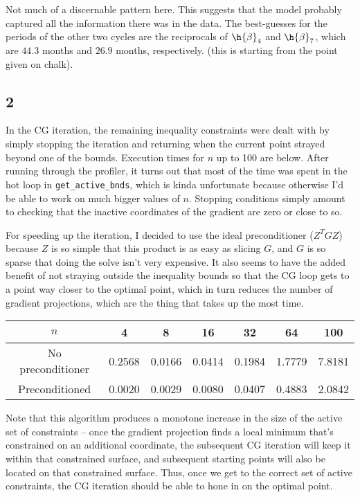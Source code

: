 \documentclass{article}
\begin{document}
Not much of a discernable pattern here. This suggests that the model probably captured all the information there was in the data. The best-guesses for the periods of the other two cycles are the reciprocals of $\h{\beta}_4$ and $\h{\beta}_7$, which are $44.3$ months and $26.9$ months, respectively. (this is starting from the point given on chalk).
\subsection*{2}
In the CG iteration, the remaining inequality constraints were dealt with by simply stopping the iteration and returning when the current point strayed beyond one of the bounds. Execution times for $n$ up to 100 are below. After running through the profiler, it turns out that most of the time was spent in the hot loop in \verb|get_active_bnds|, which is kinda unfortunate because otherwise I'd be able to work on much bigger values of $n$. Stopping conditions simply amount to checking that the inactive coordinates of the gradient are zero or close to so.

For speeding up the iteration, I decided to use the ideal preconditioner ($Z^TGZ$) because $Z$ is so simple that this product is as easy as slicing $G$, and $G$ is so sparse that doing the solve isn't very expensive. It also seems to have the added benefit of not straying outside the inequality bounds so that the CG loop gets to a point way closer to the optimal point, which in turn reduces the number of gradient projections, which are the thing that takes up the most time.

\begin{tabular}{c|cccccc}
    $n$&4&8&16&32&64&100\\
    \hline
    No preconditioner&0.2568&0.0166&0.0414&0.1984&1.7779&7.8181\\
    \hline
    Preconditioned&0.0020&0.0029&0.0080&0.0407&0.4883&2.0842\\
\end{tabular}

Note that this algorithm produces a monotone increase in the size of the active set of constraints -- once the gradient projection finds a local minimum that's constrained on an additional coordinate, the subsequent CG iteration will keep it within that constrained surface, and subsequent starting points will also be located on that constrained surface. Thus, once we get to the correct set of active constraints, the CG iteration should be able to hone in on the optimal point. 
\end{document}
